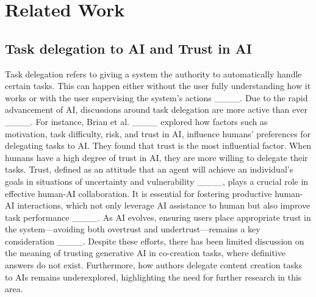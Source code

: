 \section{Related Work}
\subsection{Task delegation to AI and Trust in AI}
Task delegation refers to giving a system the authority to automatically handle certain tasks. This can happen either without the user fully understanding how it works or with the user supervising the system’s actions ____. Due to the rapid advancement of AI, discussions around task delegation are more active than ever ____. For instance, Brian et al. ____ explored how factors such as motivation, task difficulty, risk, and trust in AI, influence humans’ preferences for delegating tasks to AI. They found that trust is the most influential factor. When humans have a high degree of trust in AI, they are more willing to delegate their tasks. Trust, defined as an attitude that an agent will achieve an individual's goals in situations of uncertainty and vulnerability ____, plays a crucial role in effective human-AI collaboration. It is essential for fostering productive human-AI interactions, which not only leverage AI assistance to human but also improve task performance ____. As AI evolves, ensuring users place appropriate trust in the system—avoiding both overtrust and undertrust—remains a key consideration ____. Despite these efforts, there has been limited discussion on the meaning of trusting generative AI in co-creation tasks, where definitive answers do not exist. Furthermore, how authors delegate content creation tasks to AIs remains underexplored, highlighting the need for further research in this area.


